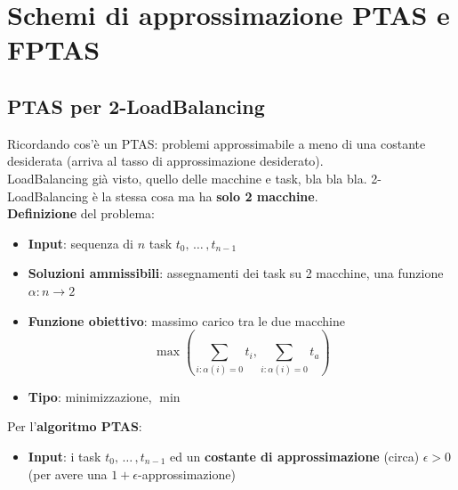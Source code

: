 \documentclass[11pt]{article}
\begin{document}
	\newpage
	
	\section{Schemi di approssimazione PTAS e FPTAS}
	\subsection{PTAS per 2-LoadBalancing}
	
	Ricordando cos'è un PTAS: problemi approssimabile a meno di una costante desiderata (arriva al tasso di approssimazione desiderato).\\
	
	LoadBalancing già visto, quello delle macchine e task, bla bla bla. 2-LoadBalancing è la stessa cosa ma ha \textbf{solo 2 macchine}.\\
	
	\textbf{Definizione} del problema:
	\begin{itemize}
		\item \textbf{Input}: sequenza di $n$ task $t_0, \, \dots \, , t_{n-1}$
		\item \textbf{Soluzioni ammissibili}: assegnamenti dei task su 2 macchine, una funzione $\alpha: n \rightarrow 2$
		\item \textbf{Funzione obiettivo}: massimo carico tra le due macchine 
		$$ \max \left(\sum_{i: \alpha(i)=0} t_i , \sum_{i: \alpha(i)=0} t_a\right) $$
		\item \textbf{Tipo}: minimizzazione, $\min$
	\end{itemize}
	
	\nn
	
	Per l'\textbf{algoritmo PTAS}: 
	\begin{itemize}
		\item \textbf{Input}:  i task $t_0, \, \dots \, , t_{n-1}$ ed un \textbf{costante di approssimazione} (circa) $\epsilon > 0$ (per avere una $1+\epsilon$-approssimazione)
	\end{itemize}
	
	\newpage
	
\end{document}

